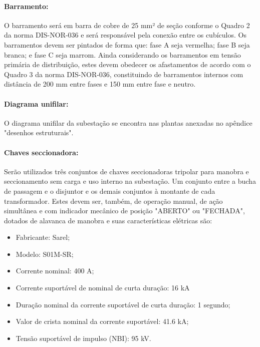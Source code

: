 
\paragraph{Barramento:}

O barramento será em barra de cobre de 25 mm² de seção conforme o Quadro 2 da norma DIS-NOR-036 e será responsável pela conexão entre os cubículos. Os barramentos devem ser pintados de forma que: fase A seja vermelha; fase B seja branca; e fase C seja marrom. Ainda considerando os barramentos em tensão primária de distribuição, estes devem obedecer os afastamentos de acordo com o Quadro 3 da norma DIS-NOR-036, constituindo de barramentos internos com distância de 200 mm entre fases e 150 mm entre fase e neutro.

\paragraph{Diagrama unifilar:}

O diagrama unifilar da subestação se encontra nas plantas anexadas no apêndice "desenhos estruturais".

\paragraph{Chaves seccionadora:}

Serão utilizados três conjuntos de chaves seccionadoras tripolar para manobra e seccionamento sem carga e uso interno na subestação. Um conjunto entre a bucha de passagem e o disjuntor e os demais conjuntos à montante de cada transformador. Estes devem ser, também, de operação manual, de ação simultânea e com indicador mecânico de posição "ABERTO" ou "FECHADA", dotados de alavanca de manobra e suas características elétricas são:
\begin{itemize}
    \item Fabricante: Sarel;
    \item Modelo: S01M-SR;
    \item Corrente nominal: 400 A;
    \item Corrente suportável de nominal de curta duração: 16 kA
    \item Duração nominal da corrente suportável de curta duração: 1 segundo;
    \item Valor de crista nominal da corrente suportável: 41.6 kA;
    \item Tensão suportável de impulso (NBI): 95 kV.
\end{itemize}


